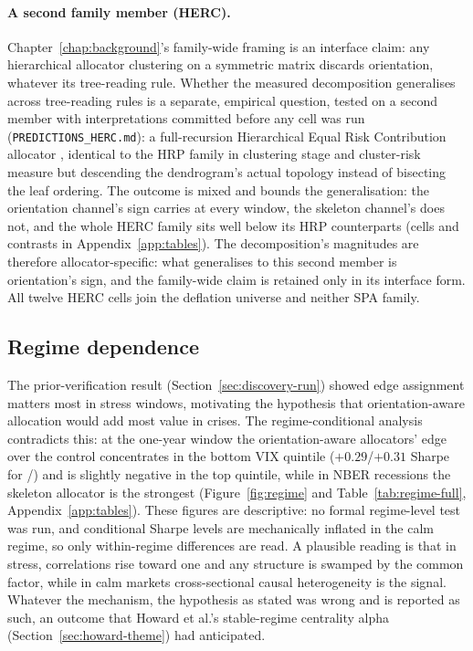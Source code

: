 \paragraph{A second family member (HERC).} Chapter~\ref{chap:background}'s
family-wide framing is an interface claim: any hierarchical allocator
clustering on a symmetric matrix discards orientation, whatever its
tree-reading rule. Whether the measured decomposition
generalises across tree-reading rules is a separate, empirical
question, tested on a second member with interpretations committed
before any cell was run (\texttt{PREDICTIONS\_HERC.md}): a
full-recursion Hierarchical Equal Risk Contribution allocator
\cite{raffinot2018herc}, identical to the HRP family in clustering
stage and cluster-risk measure but descending the dendrogram's actual
topology instead of bisecting the leaf ordering. The outcome is mixed
and bounds the generalisation: the orientation channel's sign carries
at every window, the skeleton channel's does not, and the whole HERC
family sits well below its HRP counterparts (cells and contrasts in
Appendix~\ref{app:tables}). The decomposition's magnitudes are
therefore allocator-specific: what generalises to this second member
is orientation's sign, and the family-wide claim is retained only in
its interface form. All twelve HERC cells join the deflation universe
and neither SPA family.

\subsection{Regime dependence}
\label{sec:regimes}

The prior-verification result (Section~\ref{sec:discovery-run}) showed
edge assignment matters most in stress windows, motivating the
hypothesis that orientation-aware allocation would add most value in
crises. The regime-conditional analysis contradicts this: at the
one-year window the orientation-aware allocators' edge over the \HRP{}
control concentrates in the bottom VIX quintile ($+0.29$/$+0.31$
Sharpe for \skelsem{}/\orientsem{}) and is slightly negative in the
top quintile, while in NBER recessions the skeleton allocator is the
strongest (Figure~\ref{fig:regime} and Table~\ref{tab:regime-full},
Appendix~\ref{app:tables}). These figures are descriptive: no formal
regime-level test was run, and conditional Sharpe levels are
mechanically inflated in the calm regime, so only within-regime
differences are read. A plausible reading is that in stress,
correlations rise toward one and any structure is swamped by the
common factor, while in calm markets cross-sectional causal
heterogeneity is the signal. Whatever the mechanism, the hypothesis as
stated was wrong and is reported as such, an outcome that Howard et
al.'s stable-regime centrality alpha (Section~\ref{sec:howard-theme})
had anticipated.

